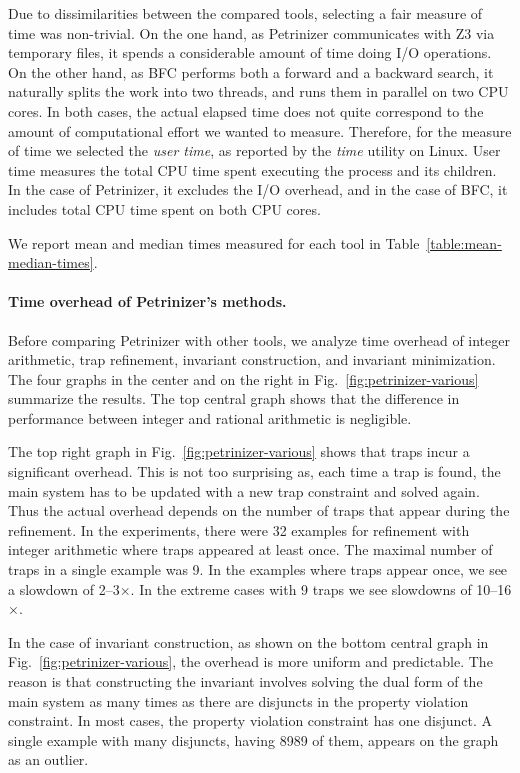 Due to dissimilarities between the compared tools, selecting a fair
measure of time was non-trivial. On the one hand, as
Petrinizer communicates with Z3 via temporary files, it spends a
considerable amount of time doing I/O operations.  On the other hand,
as BFC performs both a forward and a backward search, it naturally
splits the work into two threads, and runs them in parallel on two CPU
cores. In both cases, the actual elapsed time does not quite
correspond to the amount of computational effort we wanted to measure.
Therefore, for the measure of time we selected the \emph{user time},
as reported by the \emph{time} utility on Linux. User time measures
the total CPU time spent executing the process and its children. In
the case of Petrinizer, it excludes the I/O overhead, and in the case
of BFC, it includes total CPU time spent on both CPU cores.

We report mean and median times measured for each tool in
Table~\ref{table:mean-median-times}.

\paragraph{Time overhead of Petrinizer's methods.} Before comparing Petrinizer
with other tools, we analyze time overhead of integer arithmetic, trap refinement, invariant construction, and invariant minimization.
The four graphs in the center and on the right in
Fig.~\ref{fig:petrinizer-various} summarize the results. The top
central graph shows that the difference in performance between integer
and rational arithmetic is negligible.

The top right graph in Fig.~\ref{fig:petrinizer-various} shows that traps
incur a significant overhead. This is not too surprising as, each time
a trap is found, the main system has to be updated with a new trap
constraint and solved again. Thus the actual overhead depends on the number
of traps that appear during the refinement. In the experiments, there
were 32 examples for refinement with integer arithmetic where traps
appeared at least once. The maximal number of traps in a single example was 9.
In the examples where traps appear once, we see a slowdown of 2–3$\times$. In
the extreme cases with 9 traps we see slowdowns of 10–16$\times$.

In the case of invariant construction, as shown on the bottom central graph in
Fig.~\ref{fig:petrinizer-various}, the overhead is more
uniform and predictable. The reason is that constructing the invariant
involves solving the dual form of the main system as many times as
there are disjuncts in the property violation constraint. In most
cases, the property violation constraint has one disjunct. A single example
with many disjuncts, having 8989 of them, appears on the graph
as an outlier.

